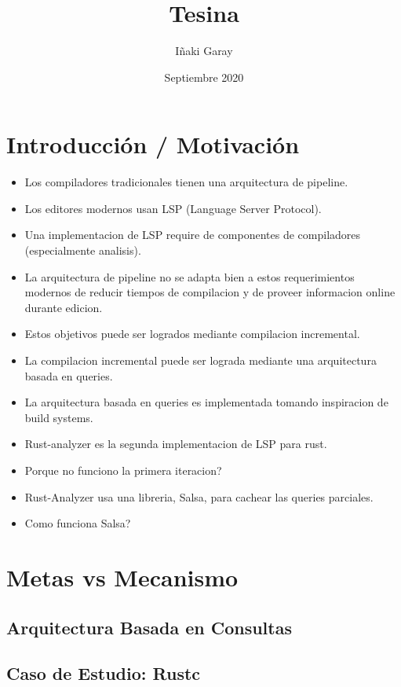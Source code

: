 \documentclass[10pt, a4paper]{report}
\title{Tesina}
\author{Iñaki Garay}
\date{Septiembre 2020}
\begin{document}
\begin{titlepage}
\maketitle
\end{titlepage}

\tableofcontents

\section*{Introducción / Motivación}

\begin{itemize}[noitemsep]
\item Los compiladores tradicionales tienen una arquitectura de pipeline.
\item Los editores modernos usan LSP (Language Server Protocol).
\item Una implementacion de LSP require de componentes de compiladores (especialmente analisis).
\item La arquitectura de pipeline no se adapta bien a estos requerimientos modernos de reducir tiempos de compilacion y de proveer informacion online durante edicion.
\item Estos objetivos puede ser logrados mediante compilacion incremental.
\item La compilacion incremental puede ser lograda mediante una arquitectura basada en queries.
\item La arquitectura basada en queries es implementada tomando inspiracion de build systems.
\item Rust-analyzer es la segunda implementacion de LSP para rust.
\item Porque no funciono la primera iteracion?
\item Rust-Analyzer usa una libreria, Salsa, para cachear las queries parciales.
\item Como funciona Salsa?
\end{itemize}

\section*{Metas vs Mecanismo}

\subsection*{Arquitectura Basada en Consultas}

\subsection*{Caso de Estudio: Rustc}
\end{document}
